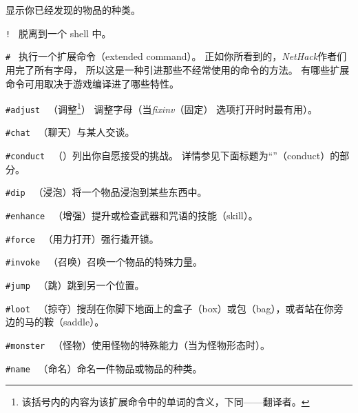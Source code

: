\documentclass[a4paper, 10pt]{article}
\newcommand{\tb}[1]{\tt #1 \hfill}
\begin{document}
显示你已经发现的物品的种类。
\item[\tb{!}]
脱离到一个 shell 中。
\item[\tb{\#}]
执行一个扩展命令（extended command）。
正如你所看到的，{\it NetHack\/}作者们用完了所有字母，
所以这是一种引进那些不经常使用的命令的方法。
有哪些扩展命令可用取决于游戏编译进了哪些特性。
\item[\tb{\#adjust}]
（调整\footnote{该括号内的内容为该扩展命令中的单词的含义，下同——翻译者。}）
调整\zhTransInventory{}字母（当{\it fixinv\/}（固定\zhTransInventory）
选项打开时时最有用）。
\item[\tb{\#chat}]
（聊天）与某人交谈。
\item[\tb{\#conduct}]
（\zhTransConduct）列出你自愿接受的挑战。
详情参见下面标题为“\zhTransConduct”（conduct）的部分。
\item[\tb{\#dip}]
（浸泡）将一个物品浸泡到某些东西中。
\item[\tb{\#enhance}]
（增强）提升或检查武器和咒语的技能（skill）。
\item[\tb{\#force}]
（用力打开）强行撬开锁。
\item[\tb{\#invoke}]
（召唤）召唤一个物品的特殊力量。
\item[\tb{\#jump}]
（跳）跳到另一个位置。
\item[\tb{\#loot}]
（掠夺）搜刮在你脚下地面上的盒子（box）或包（bag），或者站在你旁边的马的鞍（saddle）。
\item[\tb{\#monster}]
（怪物）使用怪物的特殊能力（当\zhTransPolymorph{}为怪物形态时）。
\item[\tb{\#name}]
（命名）命名一件物品或物品的种类。
\end{document}
